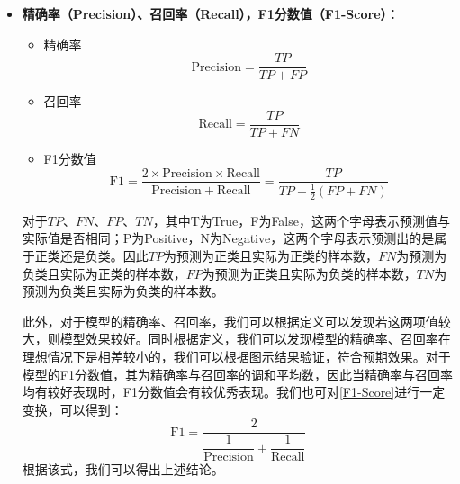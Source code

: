 \documentclass{MathorCupmodeling}
\begin{document}
\begin{itemize}
		\item \textbf{精确率（Precision）、召回率（Recall），F1分数值（F1-Score）}：
		\begin{itemize}
			\item {\heiti 精确率}
			\begin{equation}
				\mathrm{Precision} = \frac{TP}{TP+FP} \label{Precision}
			\end{equation}
			\item {\heiti 召回率}
			\begin{equation}
				\mathrm{Recall} = \frac{TP}{TP+FN} \label{Recall}
			\end{equation}
			\item {\heiti F1分数值} 
			\begin{equation}
				\mathrm{F}1 = \frac{2\times \mathrm{Precision}\times \mathrm{Recall}}{\mathrm{Precision}+\mathrm{Recall}}=\frac{TP}{TP+\frac{1}{2}\left(FP+FN\right)} \label{F1-Score}
			\end{equation}
		\end{itemize}
		对于$TP$、$FN$、$FP$、$TN$，其中T为True，F为False，这两个字母表示预测值与实际值是否相同；P为Positive，N为Negative，这两个字母表示预测出的是属于正类还是负类。因此$TP$为预测为正类且实际为正类的样本数，$FN$为预测为负类且实际为正类的样本数，$FP$为预测为正类且实际为负类的样本数，$TN$为预测为负类且实际为负类的样本数。

		此外，对于模型的精确率、召回率，我们可以根据定义可以发现若这两项值较大，则模型效果较好。同时根据定义，我们可以发现模型的精确率、召回率在理想情况下是相差较小的，我们可以根据图示结果验证，符合预期效果。对于模型的F1分数值，其为精确率与召回率的调和平均数\textcolor{blue}{\cite{模型评测}}，因此当精确率与召回率均有较好表现时，F1分数值会有较优秀表现。我们也可对\textcolor{blue}{\eqref{F1-Score}}进行一定变换，可以得到：
		\begin{equation}
			\mathrm{F}1=\frac{2}{\dfrac{1}{\mathrm{Precision}}+\dfrac{1}{\mathrm{Recall}}} \label{ReacllNew}
		\end{equation}
		根据该式，我们可以得出上述结论。


\end{itemize}
\end{document}
